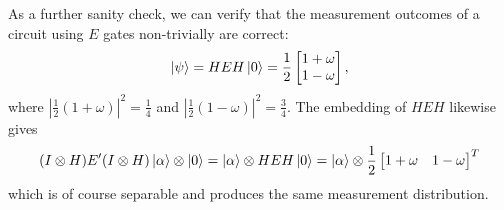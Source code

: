 \documentclass{article}
\theoremstyle{definition}
\theoremstyle{theorem}
\theoremstyle{remark}
\begin{document}
As a further sanity check, we can verify that the measurement outcomes of a circuit using $E$ gates non-trivially are correct:
\[
	\ket{\psi} = HEH\ket{0} = \frac{1}{2}\begin{bmatrix} 1 + \omega \\ 1 - \omega \end{bmatrix},
\]
where $|\frac{1}{2}(1 + \omega)|^2 = \frac{1}{4}$ and $|\frac{1}{2}(1 - \omega)|^2 = \frac{3}{4}$. The embedding of $HEH$ likewise gives
\[
	(I\otimes H)E'(I\otimes H)\ket{\alpha}\otimes\ket{0} 
		= \ket{\alpha}\otimes HEH\ket{0} 
		= \ket{\alpha} \otimes \frac{1}{2}\begin{bmatrix} 1 + \omega & 1 - \omega \end{bmatrix}^T
\]
which is of course separable and produces the same measurement distribution.
\end{document}
